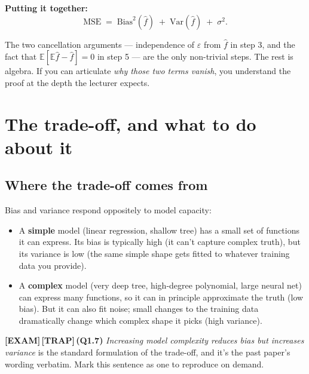 \documentclass[11pt, a4paper]{article}
\newcommand{\examflag}{\textcolor{tipBd}{\textbf{[EXAM]}}\,}
\newcommand{\trapflag}{\textcolor{trapBd}{\textbf{[TRAP]}}\,}
\begin{document}
\textbf{Putting it together:}
\[
\text{MSE} \;=\; \text{Bias}^2(\hat f) \;+\; \mathrm{Var}(\hat f) \;+\; \sigma^2.
\]

\begin{notebox}
The two cancellation arguments — independence of $\varepsilon$ from $\hat{f}$ in step 3, and the fact that $\mathbb{E}[\mathbb{E}\hat{f} - \hat{f}] = 0$ in step 5 — are the only non-trivial steps. The rest is algebra. If you can articulate \emph{why those two terms vanish}, you understand the proof at the depth the lecturer expects.
\end{notebox}

\section{The trade-off, and what to do about it}

\subsection{Where the trade-off comes from}

Bias and variance respond oppositely to model capacity:

\begin{itemize}
  \item A \textbf{simple} model (linear regression, shallow tree) has a small set of functions it can express. Its bias is typically high (it can't capture complex truth), but its variance is low (the same simple shape gets fitted to whatever training data you provide).
  \item A \textbf{complex} model (very deep tree, high-degree polynomial, large neural net) can express many functions, so it can in principle approximate the truth (low bias). But it can also fit noise; small changes to the training data dramatically change which complex shape it picks (high variance).
\end{itemize}

\examflag{}\trapflag{}\textbf{(Q1.7)} \emph{Increasing model complexity reduces bias but increases variance} is the standard formulation of the trade-off, and it's the past paper's wording verbatim. Mark this sentence as one to reproduce on demand.
\end{document}
